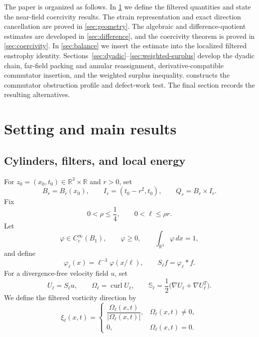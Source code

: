 \documentclass[11pt]{article}
\numberwithin{equation}{section}
\theoremstyle{plain}
\theoremstyle{definition}
\theoremstyle{remark}
\DeclareMathOperator{\curl}{curl}
\newcommand{\R}{\mathbb R}
\begin{document}
The paper is organized as follows.  In \cref{sec:setting} we define the filtered quantities and state the near-field coercivity results.  The strain representation and exact direction cancellation are proved in \cref{sec:geometry}.  The algebraic and difference-quotient estimates are developed in \cref{sec:difference}, and the coercivity theorem is proved in \cref{sec:coercivity}.  In \cref{sec:balance} we insert the estimate into the localized filtered enstrophy identity.  Sections~\ref{sec:dyadic}--\ref{sec:weighted-surplus} develop the dyadic chain, far-field packing and annular reassignment, derivative-compatible commutator insertion, and the weighted surplus inequality.   constructs the commutator obstruction profile and defect-work test.  The final section records the resulting alternatives.

\section{Setting and main results}\label{sec:setting}

\subsection{Cylinders, filters, and local energy}

For $z_0=(x_0,t_0)\in\R^3\times\R$ and $r>0$, set
\[
B_r=B_r(x_0),
\qquad
I_r=(t_0-r^2,t_0),
\qquad
Q_r=B_r\times I_r.
\]
Fix
\begin{equation}\label{eq:rho-range}
0<\rho\le \frac14,
\qquad
0<\ell\le \rho r.
\end{equation}
Let
\begin{equation}\label{eq:mollifier}
\varphi\in C_c^\infty(B_1),
\qquad
\varphi\ge0,
\qquad
\int_{\R^3}\varphi\,dx=1,
\end{equation}
and define
\[
\varphi_\ell(x)=\ell^{-3}\varphi(x/\ell),
\qquad
S_\ell f=\varphi_\ell*f.
\]
For a divergence-free velocity field $u$, set
\begin{equation}\label{eq:filtered-fields}
U_\ell=S_\ell u,
\qquad
\Omega_\ell=\curl U_\ell,
\qquad
\mathbb S_\ell=\frac12\bigl(\nabla U_\ell+\nabla U_\ell^T\bigr).
\end{equation}
We define the filtered vorticity direction by
\begin{equation}\label{eq:direction}
\xi_\ell(x,t)=
\begin{cases}
\dfrac{\Omega_\ell(x,t)}{|\Omega_\ell(x,t)|},&\Omega_\ell(x,t)\ne0,\\[1.2ex]
0,&\Omega_\ell(x,t)=0.
\end{cases}
\end{equation}
\end{document}
